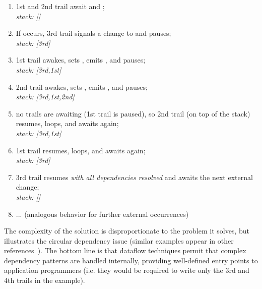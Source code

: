 {\small
\begin{enumerate}
\setlength{\itemsep}{0pt}
\item 1st and 2nd trail await  and ;\\
    \emph{stack: []}
\item If  occurs, 3rd trail signals a change to  and 
    pauses;\\
    \emph{stack: [3rd]}
\item 1st trail awakes, sets , emits , and pauses;\\
    \emph{stack: [3rd,1st]}
\item 2nd trail awakes, sets , emits , and pauses;\\
    \emph{stack: [3rd,1st,2nd]}
\item no trails are awaiting  (1st trail is paused), so 2nd trail 
    (on top of the stack) resumes, loops, and awaits  again;\\
    \emph{stack: [3rd,1st]}
\item 1st trail resumes, loops, and awaits  again;\\
    \emph{stack: [3rd]}
\item 3rd trail resumes \emph{with all dependencies resolved} and awaits the 
    next external change;\\
    \emph{stack: []}
\item ... (analogous behavior for further external occurrences)
\end{enumerate}
}

The complexity of the solution is disproportionate to the problem it solves, 
but illustrates the circular dependency issue (similar examples appear in other 
references~\cite{frp.survey,frtime.embedding}).
The bottom line is that dataflow techniques permit that complex dependency 
patterns are handled internally, providing well-defined entry points to 
application programmers (i.e. they would be required to write only the 3rd and 
4th trails in the example).


